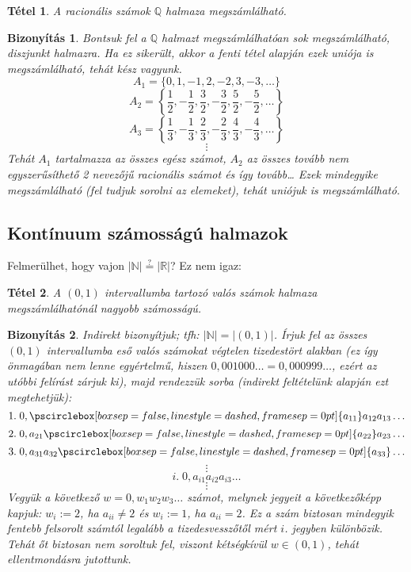 \documentclass[a4paper,12pt,twoside]{book}
\newcommand{\N}{\mathbb{N}}
\newcommand{\R}{\mathbb{R}}
\newtheorem{tetel}{Tétel}[chapter]
\newtheorem{biz}{Bizonyítás}[chapter]
\theoremstyle{break}
\begin{document}
\begin{tetel}
 A racionális számok $\mathbb{Q}$ halmaza megszámlálható.
\end{tetel}
\begin{biz}
 Bontsuk fel a $\mathbb{Q}$ halmazt megszámlálhatóan sok megszámlálható, diszjunkt halmazra. Ha ez sikerült, akkor a fenti tétel alapján ezek uniója is megszámlálható, tehát kész vagyunk.
 \[A_1 = \{0,1,-1,2,-2,3,-3,\ldots\}\]
 \[A_2 = \left\{\frac{1}{2},-\frac{1}{2},\frac{3}{2},-\frac{3}{2},\frac{5}{2},-\frac{5}{2},\ldots\right\}\]
 \[A_3 = \left\{\frac{1}{3},-\frac{1}{3},\frac{2}{3},-\frac{2}{3},\frac{4}{3},-\frac{4}{3},\ldots\right\}\]
 \[\vdots\]
 Tehát $A_1$ tartalmazza az összes egész számot, $A_2$ az összes tovább nem egyszerűsíthető 2 nevezőjű racionális számot és így tovább{\ldots} Ezek mindegyike megszámlálható (fel tudjuk sorolni az elemeket), tehát uniójuk is megszámlálható.
\end{biz}

\subsection{Kontínuum számosságú halmazok}

Felmerülhet, hogy vajon $|\N|\overset{?}{=}|\R|$? Ez nem igaz:

\begin{tetel}
 A $(0,1)$ intervallumba tartozó valós számok halmaza megszámlálhatónál nagyobb számosságú.
\end{tetel}
\begin{biz}
 Indirekt bizonyítjuk; tfh: $|\N| = |(0,1)|$. Írjuk fel az összes $(0,1)$ intervallumba eső valós számokat végtelen tizedestört alakban (ez így önmagában nem lenne egyértelmű, hiszen $0,001000\ldots = 0,000999\ldots$, ezért az utóbbi felírást zárjuk ki), majd rendezzük sorba (indirekt feltételünk alapján ezt megtehetjük):
 \[1. \; 0,\pscirclebox[boxsep=false,linestyle=dashed,framesep=0pt]{a_{11}}a_{12}a_{13}\ldots\]
 \[2. \; 0,a_{21}\pscirclebox[boxsep=false,linestyle=dashed,framesep=0pt]{a_{22}}a_{23}\ldots\]
 \[3. \; 0,a_{31}a_{32}\pscirclebox[boxsep=false,linestyle=dashed,framesep=0pt]{a_{33}}\ldots\]
 \[\vdots\]
 \[i. \; 0,a_{i1}a_{i2}a_{i3}\ldots\]
 \[\vdots\]
 Vegyük a következő $w = 0,w_1w_2w_3\ldots$ számot, melynek jegyeit a következőképp kapjuk: $w_i := 2$, ha $a_{ii}\neq 2$ és $w_i := 1$, ha $a_{ii}=2$. Ez a szám biztosan mindegyik fentebb felsorolt számtól legalább a tizedesvesszőtől mért $i$. jegyben különbözik. Tehát őt biztosan nem soroltuk fel, viszont kétségkívül $w\in(0,1)$, tehát ellentmondásra jutottunk.
\end{biz}
\end{document}
